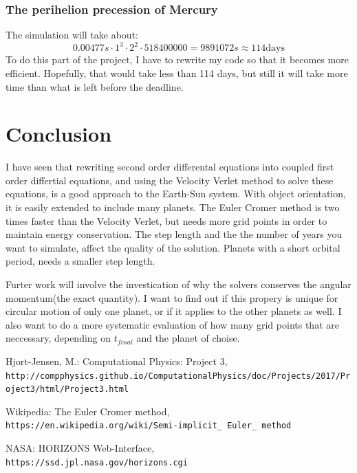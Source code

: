 \documentclass{article}
\begin{document}
\subsubsection{The perihelion precession of Mercury}

The simulation will take about: 
$$0.00477s \cdot 1^3 \cdot 2^2 \cdot 518400000 = 9891072 s  \approx 114 \textrm{days} $$
To do this part of the project, I have to rewrite my code so that it becomes more efficient. Hopefully, that would take less than 114 days, but still it will take more time than what is left before the deadline. 
\section{Conclusion}
I have seen that rewriting second order differental equations into coupled first order differtial equations, and using the Velocity Verlet method to solve these equations, is a good approach to the Earth-Sun system. With object orientation, it is easily extended to include many planets. The Euler Cromer method is two times faster than the Velocity Verlet, but needs more grid points in order to maintain energy conservation. The step length and the the number of years you want to simulate, affect the quality of the solution. Planets with a short orbital period, needs a smaller step length. 


Furter work will involve the investication of why the solvers conserves the angular momentum(the exact quantity). I want to find out if this propery is unique for circular motion of only one planet, or if it applies to the other planets as well. I also want to do a more systematic evaluation of how many grid points that are neccessary, depending on $t_{final}$ and the planet of choise. 
\begin{thebibliography}{1}

Hjort-Jensen, M.: Computational Physics: Project 3,
\\\texttt{http://compphysics.github.io/ComputationalPhysics/doc/Projects/2017/Project3/html/Project3.html}

Wikipedia: The Euler Cromer method,
\\\texttt{https://en.wikipedia.org/wiki/Semi-implicit\_ Euler\_ method}

NASA: HORIZONS Web-Interface,
\\\texttt{https://ssd.jpl.nasa.gov/horizons.cgi}

\end{thebibliography}
\end{document}
